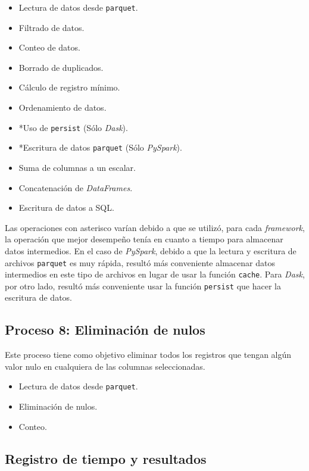 \begin{itemize}
	\item Lectura de datos desde \texttt{parquet}.
	\item Filtrado de datos.
	\item Conteo de datos.
	\item Borrado de duplicados.
	\item Cálculo de registro mínimo.
	\item Ordenamiento de datos.
	\item *Uso de \texttt{persist} (Sólo \textit{Dask}).
	\item *Escritura de datos \texttt{parquet} (Sólo \textit{PySpark}).
	\item Suma de columnas a un escalar.
	\item Concatenación de \textit{DataFrames}.
	\item Escritura de datos a SQL.
\end{itemize}

Las operaciones con asterisco varían debido a que se utilizó, para cada \textit{framework}, la operación que mejor desempeño tenía en cuanto a tiempo para almacenar datos intermedios. En el caso de \textit{PySpark}, debido a que la lectura y escritura de archivos \texttt{parquet} es muy rápida, resultó más conveniente almacenar datos intermedios en este tipo de archivos en lugar de usar la función \texttt{cache}. Para \textit{Dask}, por otro lado, resultó más conveniente usar la función \texttt{persist} que hacer la escritura de datos.

\subsection{Proceso 8: Eliminación de nulos}

Este proceso tiene como objetivo eliminar todos los registros que tengan algún valor nulo en cualquiera de las columnas seleccionadas. 

\begin{itemize}
	\item Lectura de datos desde \texttt{parquet}.
	\item Eliminación de nulos.
	\item Conteo.
\end{itemize}

\subsection{Registro de tiempo y resultados}

